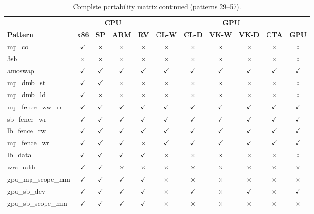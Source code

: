 \documentclass[10pt]{article}
\newcommand{\cmark}{$\checkmark$}
\newcommand{\xmark}{$\times$}
\begin{document}
{\tiny
\begin{table}[p]
\centering
\caption{Complete portability matrix continued (patterns 29--57).}
\begin{tabular}{l cccc cccccc}
\toprule
& \multicolumn{4}{c}{\textbf{CPU}} & \multicolumn{6}{c}{\textbf{GPU}} \\
\cmidrule(lr){2-5} \cmidrule(lr){6-11}
\textbf{Pattern} & \textbf{x86} & \textbf{SP} & \textbf{ARM} & \textbf{RV}
& \textbf{CL-W} & \textbf{CL-D} & \textbf{VK-W} & \textbf{VK-D} & \textbf{CTA} & \textbf{GPU} \\
\midrule
mp\_co & \cmark & \xmark & \xmark & \xmark & \xmark & \xmark & \xmark & \xmark & \xmark & \xmark \\
3sb & \xmark & \xmark & \xmark & \xmark & \xmark & \xmark & \xmark & \xmark & \xmark & \xmark \\
amoswap & \cmark & \cmark & \cmark & \cmark & \cmark & \cmark & \cmark & \cmark & \cmark & \cmark \\
mp\_dmb\_st & \cmark & \cmark & \xmark & \xmark & \xmark & \xmark & \xmark & \xmark & \xmark & \xmark \\
mp\_dmb\_ld & \cmark & \xmark & \xmark & \xmark & \xmark & \xmark & \xmark & \xmark & \xmark & \xmark \\
mp\_fence\_ww\_rr & \cmark & \cmark & \cmark & \cmark & \cmark & \cmark & \cmark & \cmark & \cmark & \cmark \\
sb\_fence\_wr & \cmark & \cmark & \cmark & \cmark & \cmark & \cmark & \cmark & \cmark & \cmark & \cmark \\
lb\_fence\_rw & \cmark & \cmark & \cmark & \cmark & \cmark & \cmark & \cmark & \cmark & \cmark & \cmark \\
mp\_fence\_wr & \cmark & \cmark & \cmark & \xmark & \cmark & \cmark & \cmark & \cmark & \cmark & \cmark \\
lb\_data & \cmark & \cmark & \cmark & \cmark & \xmark & \xmark & \xmark & \xmark & \xmark & \xmark \\
wrc\_addr & \cmark & \cmark & \xmark & \xmark & \xmark & \xmark & \xmark & \xmark & \xmark & \xmark \\
gpu\_mp\_scope\_mm & \cmark & \cmark & \cmark & \cmark & \xmark & \xmark & \xmark & \xmark & \xmark & \xmark \\
gpu\_sb\_dev & \cmark & \cmark & \cmark & \cmark & \xmark & \cmark & \xmark & \cmark & \xmark & \cmark \\
gpu\_sb\_scope\_mm & \cmark & \cmark & \cmark & \cmark & \xmark & \xmark & \xmark & \xmark & \xmark & \xmark \\

\end{tabular}
\end{table}}
\end{document}
